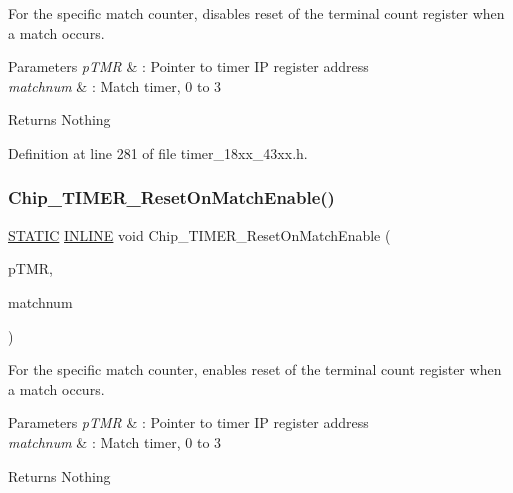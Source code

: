 For the specific match counter, disables reset of the terminal count register when a match occurs. 


\begin{DoxyParams}{Parameters}
{\em p\+T\+MR} & \+: Pointer to timer IP register address \\
\hline
{\em matchnum} & \+: Match timer, 0 to 3 \\
\hline
\end{DoxyParams}
\begin{DoxyReturn}{Returns}
Nothing 
\end{DoxyReturn}


Definition at line 281 of file timer\+\_\+18xx\+\_\+43xx.\+h.

\mbox{\label{group___t_i_m_e_r__18_x_x__43_x_x_ga4b8a551b290e9f70ba8b8569e2937f58}} 
\subsubsection{\texorpdfstring{Chip\+\_\+\+T\+I\+M\+E\+R\+\_\+\+Reset\+On\+Match\+Enable()}{Chip\_TIMER\_ResetOnMatchEnable()}}
{\footnotesize\ttfamily \hyperlink{group___l_p_c___types___public___macros_ga10b2d890d871e1489bb02b7e70d9bdfb}{S\+T\+A\+T\+IC} \hyperlink{spifi__18xx__43xx_8h_a2eb6f9e0395b47b8d5e3eeae4fe0c116}{I\+N\+L\+I\+NE} void Chip\+\_\+\+T\+I\+M\+E\+R\+\_\+\+Reset\+On\+Match\+Enable (\begin{DoxyParamCaption}\item[{\hyperlink{struct_l_p_c___t_i_m_e_r___t}{L\+P\+C\+\_\+\+T\+I\+M\+E\+R\+\_\+T} $\ast$}]{p\+T\+MR,  }\item[{int8\+\_\+t}]{matchnum }\end{DoxyParamCaption})}



For the specific match counter, enables reset of the terminal count register when a match occurs. 


\begin{DoxyParams}{Parameters}
{\em p\+T\+MR} & \+: Pointer to timer IP register address \\
\hline
{\em matchnum} & \+: Match timer, 0 to 3 \\
\hline
\end{DoxyParams}
\begin{DoxyReturn}{Returns}
Nothing 
\end{DoxyReturn}


